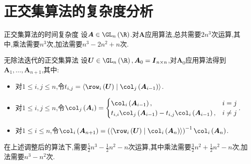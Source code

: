 \section{正交集算法的复杂度分析}

\begin{theorem}{正交集算法的时间复杂度}{}
	设$\boldsymbol{A}\in\GL_{n}\left(\R\right)$.对$\boldsymbol{A}$应用算法,总共需要$2n^{3}$次运算,其中,乘法需要$n^{3}$次,加法需要$n^{3}-2n^{2}+n$次.
\end{theorem}

\begin{theorem}{无除法迭代的正交集算法}{}
	设$\boldsymbol{U}\in\GL_{n}\left(\R\right),\boldsymbol{A}_{0}=\boldsymbol{I}_{n\times n}$,对$\boldsymbol{A}_{0}$应用算法得到$\boldsymbol{A}_{1},\ldots,\boldsymbol{A}_{n+1}$,其中:
	\begin{itemize}
		\item 对$1\leq i,j\leq n$,令$t_{i,j}=\langle\row_{i}\left(\boldsymbol{U}\right)\mid\col_{j}\left(\boldsymbol{A}_{i-1}\right)\rangle$.
		\item 对$1\leq i,j\leq n$,令$\col_{j}\left(\boldsymbol{A}_{i}\right)=
		\begin{cases}
			\col_{i}\left(\boldsymbol{A}_{i-1}\right),&i=j\\
			t_{i,i}\col_{j}\left(\boldsymbol{A}_{i-1}\right)-t_{i,j}\col_{i}\left(\boldsymbol{A}_{i-1}\right),&i\neq j
		\end{cases}$.
		\item 对$1\leq i\leq n$,令$\col_{i}\left(\boldsymbol{A}_{n+1}\right)=\left(\langle\row_{i}\left(\boldsymbol{U}\right)\mid\col_{i}\left(\boldsymbol{A}_{n}\right)\rangle\right)^{-1}\col_{i}\left(\boldsymbol{A}_{n}\right)$.
	\end{itemize}
	在上述调整后的算法下,需要$\frac{5}{2}n^{3}-\frac{1}{2}n^{2}-n$次运算,其中乘法需要$\frac{3}{2}n^{2}+\frac{1}{2}n^{2}-n$次,加法需要$n^{3}-n^{2}$次.
\end{theorem}








